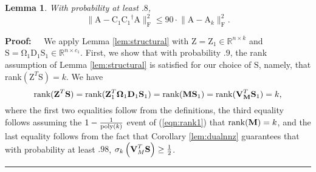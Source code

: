 \documentclass[11pt]{article}
\newcommand{\FNormS}[1]{\mbox{}\|#1\|_\mathrm{F}^2}
\newcommand{\pinv}[1]{ {#1}^\dagger}
\newtheorem{lemma}[theorem]{Lemma}
\newenvironment{proof}{\begin{trivlist} \item {\bf Proof:~~}}
  {\qed\end{trivlist}}
\newcommand{\mat}[1]{{\ensuremath{\bm{\mathrm{#1}}}}}
\def\rank{\hbox{\rm rank}}
\def\matA{\mat{A}}
\def\matC{\mat{C}}
\def\matD{\mat{D}}
\def\matM{\mat{M}}
\def\matS{\mat{S}}
\def\matV{\mat{V}}
\def\matZ{\mat{Z}}
\def\frac#1#2{{#1\over #2}}
\def\qed{\hfill\rule{2mm}{2mm}}
\newcommand{\poly}{{\mathrm{poly}}}
\begin{document}
\begin{lemma}\label{lem:conk}
With probability at least $.8$, 
$$\FNormS{\matA - \matC_1 \pinv{\matC_1}\matA} \leq 90 \cdot \FNormS{\matA-\matA_k}.$$
\end{lemma}
\begin{proof}
We apply Lemma \ref{lem:structural} with $\matZ = \matZ_1 \in \mathbb{R}^{n \times k}$ and 
$\matS = \mat\Omega_1 \matD_1 \matS_1 \in \mathbb{R}^{n \times c_1}$. First, we show that with probability $.9$, 
the rank assumption of Lemma \ref{lem:structural} is satisfied for our choice of $\matS$, namely, that 
rank$(\matZ^T \matS) = k$. We have 
$$\rank(\matZ^T \matS) =  \rank(\matZ_1^T\mat\Omega_1 \matD_1 \matS_1) = 
\rank(\matM\matS_1) = \rank(\matV_{\matM}^T\matS_1) = k,$$
where the first two equalities follow from the definitions, the third equality follows assuming the $1-\frac{1}{\poly(k)}$
event of (\ref{eqn:rank1}) that $\rank(\matM) = k$, and the last equality follows from
the fact that Corollary \ref{lem:dualnnz} guarantees that with probability at least $.98$,
$\sigma_{k}\left( \matV_M^T \matS\right) \geq \frac{1}{2}$. 


\end{proof}
\end{document}

